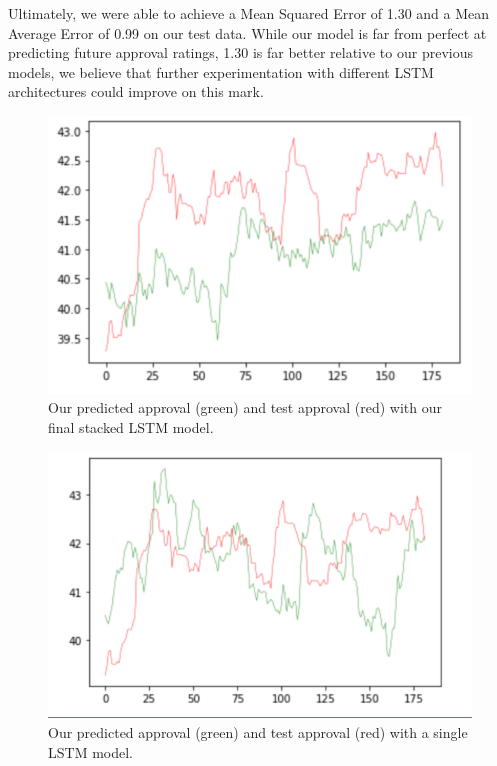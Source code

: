 \documentclass[12pt, letter-paper]{article}
\begin{document}
Ultimately, we were able to achieve a Mean Squared Error of 1.30 and a Mean Average Error of 0.99 on our test data. While our model is far from perfect at predicting future approval ratings, 1.30 is far better relative to our previous models, we believe that further experimentation with different LSTM architectures could improve on this mark. 

\begin{figure}[H]
\begin{center}
\includegraphics[width=\textwidth]{prediction.png}
\end{center}
\caption{Our predicted approval (green) and test approval (red) with our final stacked LSTM model.}
\end{figure}

\begin{figure}[H]
\begin{center}
\includegraphics[width=\textwidth]{prediction_old.png}
\end{center}
\caption{Our predicted approval (green) and test approval (red) with a single LSTM model.}
\end{figure}
\end{document}
